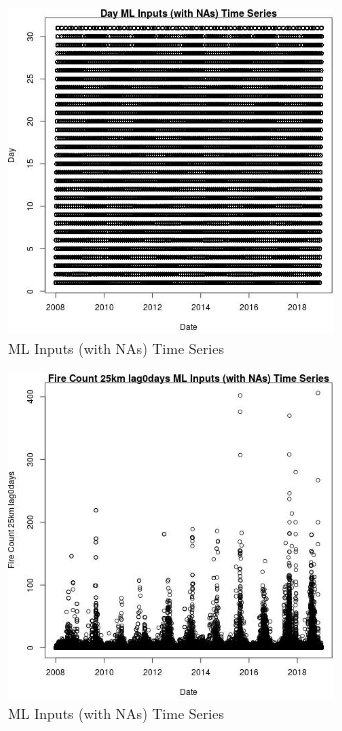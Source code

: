\begin{figure} 
\centering  
\includegraphics[width=0.77\textwidth]{Code_Outputs/Report_ML_input_PM25_Step4_part_f_de_duplicated_aves_prioritize_24hr_obswNAs_DayvDate.jpg} 
\caption{\label{fig:Report_ML_input_PM25_Step4_part_f_de_duplicated_aves_prioritize_24hr_obswNAsDayvDate}ML Inputs (with NAs) Time Series} 
\end{figure} 
 

\begin{figure} 
\centering  
\includegraphics[width=0.77\textwidth]{Code_Outputs/Report_ML_input_PM25_Step4_part_f_de_duplicated_aves_prioritize_24hr_obswNAs_Fire_Count_25km_lag0daysvDate.jpg} 
\caption{\label{fig:Report_ML_input_PM25_Step4_part_f_de_duplicated_aves_prioritize_24hr_obswNAsFire_Count_25km_lag0daysvDate}ML Inputs (with NAs) Time Series} 
\end{figure} 
 

